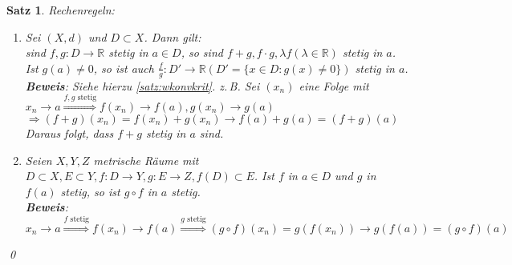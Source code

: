\documentclass[ngerman,titlepage,twoside, parskip=half*]{scrreprt}
\newcommand*{\R}{\mathbb{R}}
\theoremstyle{plain}
\newtheorem{theorem}{Satz}[section]
\theoremstyle{definition}
\theoremstyle{remark}
\begin{document}
\begin{theorem}
Rechenregeln:
\begin{enumerate}[(1)]
  \item Sei $(X,d)$ und $D \subset X$. Dann gilt:\\
    sind $f,g\colon D\rightarrow\R$ stetig in $a \in D$, so sind $f+g, f\cdot g, \lambda f (\lambda \in \R)$
    stetig in $a$. Ist $g(a)\neq 0$, so ist auch $\frac{f}{g}\colon D'\rightarrow \R (D'=\{x\in D\colon g(x)\neq 0\})$
    stetig in $a$.\\
    \textbf{Beweis}: Siehe hierzu \autoref{satz:wkonvkrit}. z.\,B. Sei $(x_n)$ eine Folge mit $x_n\rightarrow a
    \stackrel{f,g \text{ stetig}}{\Longrightarrow} f(x_n)\rightarrow f(a), g(x_n)\rightarrow g(a)$\\
    $\Rightarrow (f+g)(x_n)=f(x_n)+g(x_n)\rightarrow f(a)+g(a)=(f+g)(a)$\\
    Daraus folgt, dass $f+g$ stetig in $a$ sind.
  \item Seien $X,Y,Z$ metrische Räume mit $D\subset X, E\subset Y, f\colon D\rightarrow Y, g\colon E\rightarrow Z,
    f(D)\subset E$. Ist $f$ in $a\in D$ und $g$ in $f(a)$ stetig, so ist $g\circ f$ in $a$ stetig.\\
    \textbf{Beweis}:$x_n\rightarrow a \stackrel{f \text{ stetig}}{\Longrightarrow} f(x_n)\rightarrow f(a)
    \stackrel{g \text{ stetig}}{\Longrightarrow} (g \circ f)(x_n)=g(f(x_n))\rightarrow g(f(a))=(g\circ f)
    (a)$
\end{enumerate}
\qed
\end{theorem}
\end{document}
